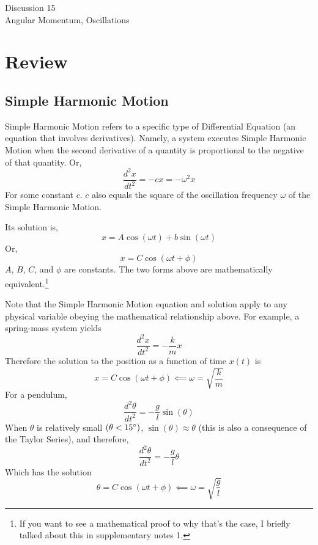 \documentclass[11pt]{article}
\theoremstyle{gangnamstyle}{\newtheorem{definition}{Definition}[]}
\theoremstyle{gangnamstyle}{\newtheorem{example}{Example}[]}
\theoremstyle{gangnamstyle}{\newtheorem{problem}{Problem}[]}
\begin{document}
\normalfont
\pagestyle{pages}


\begin{center}
\vspace{3in}
{\Large Discussion 15 } \\ [0.05in]
Angular Momentum, Oscillations \\ [-0.5in]
\end{center}

\section{Review}

\subsection{Simple Harmonic Motion}

Simple Harmonic Motion refers to a specific type of Differential Equation (an equation that involves derivatives). Namely, a system executes Simple Harmonic Motion when the second derivative of a quantity is proportional to the negative of that quantity. Or, 
\[ \frac{d^2x}{dt^2} = -cx = -\omega^2 x \]
For some constant $c$. $c$ also equals the square of the oscillation frequency $\omega$ of the Simple Harmonic Motion. 

Its solution is, 
\[ x = A\cos(\omega t) + b\sin(\omega t) \]
Or,
\[ x = C\cos(\omega t + \phi) \]
$A$, $B$, $C$, and $\phi$ are constants. The two forms above are mathematically equivalent.\footnote{If you want to see a mathematical proof to why that's the case, I briefly talked about this in supplementary notes 1.} 

Note that the Simple Harmonic Motion equation and solution apply to any physical variable obeying the mathematical relationship above. For example, a spring-mass system yields
\[ \frac{d^2x}{dt^2} = -\frac{k}{m}x \]
Therefore the solution to the position as a function of time $x(t)$ is
\[ x = C\cos(\omega t + \phi) \impliedby \omega = \sqrt{\frac{k}{m}} \]
For a pendulum,
\[ \frac{d^2\theta}{dt^2} = -\frac{g}{l}\sin(\theta) \]
When $\theta$ is relatively small $(\theta < 15\degree)$, $\sin(\theta) \approx \theta$ (this is also a consequence of the Taylor Series), and therefore,
\[ \frac{d^2\theta}{dt^2} = -\frac{g}{l}\theta \]
Which has the solution
\[ \theta = C\cos(\omega t + \phi) \impliedby \omega = \sqrt{\frac{g}{l}} \]
\end{document}
